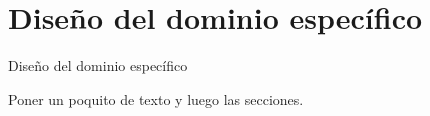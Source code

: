\section{Diseño del dominio espec\'ifico}
\label{Disenio_dominio_especifico}

Diseño del dominio espec\'ifico
\par
Poner un poquito de texto y luego las secciones.









